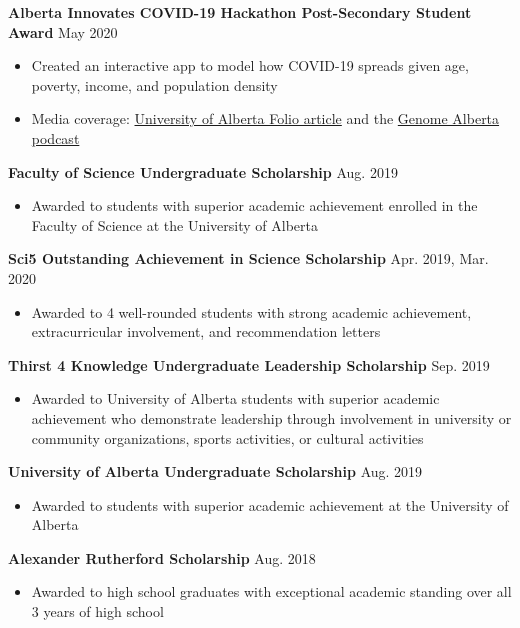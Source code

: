 \documentclass{article}
\begin{document}
\textbf{Alberta Innovates COVID-19 Hackathon Post-Secondary Student Award} \hfill May 2020
\begin{itemize}
    \item Created an interactive app to model how COVID-19 spreads given age, poverty, income, and population density
    \item Media coverage: \href{https://www.folio.ca/students-develop-online-tool-to-predict-covid-19-spread-based-on-demographics/}{University of Alberta Folio article} and the \href{https://genomealberta.ca/genomics/genomics_blog_08182001.aspx}{Genome Alberta podcast}
\end{itemize} \vspace{1em}

\textbf{Faculty of Science Undergraduate Scholarship} \hfill Aug. 2019
\begin{itemize}
    \item Awarded to students with superior academic achievement enrolled in the Faculty of Science at the University of Alberta
\end{itemize} \vspace{1em}

\textbf{Sci5 Outstanding Achievement in Science Scholarship} \hfill Apr. 2019, Mar. 2020
\begin{itemize}
    \item Awarded to 4 well-rounded students with strong academic achievement, extracurricular involvement, and recommendation letters
\end{itemize} \vspace{1em}

\textbf{Thirst 4 Knowledge Undergraduate Leadership Scholarship} \hfill Sep. 2019
\begin{itemize}
    \item Awarded to University of Alberta students with superior academic achievement who demonstrate leadership through involvement in university or community organizations, sports activities, or cultural activities
\end{itemize} \vspace{1em}

\textbf{University of Alberta Undergraduate Scholarship} \hfill Aug. 2019
\begin{itemize}
    \item Awarded to students with superior academic achievement at the University of Alberta
\end{itemize} \vspace{1em}

\textbf{Alexander Rutherford Scholarship} \hfill Aug. 2018
\begin{itemize}
    \item Awarded to high school graduates with exceptional academic standing over all 3 years of high school
\end{itemize} \vspace{1em}
\end{document}

